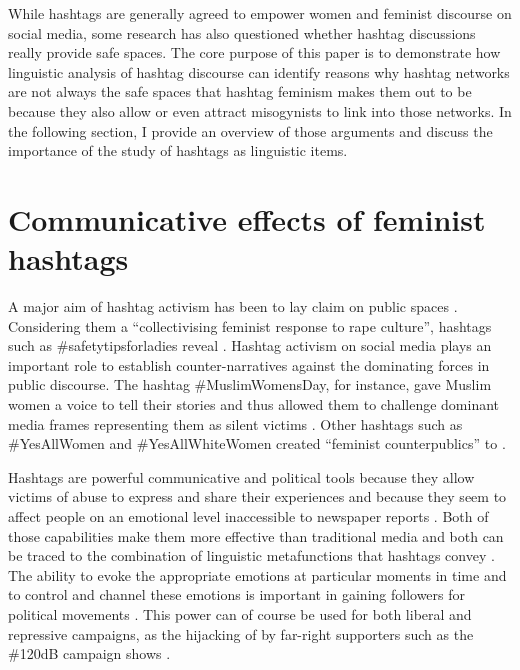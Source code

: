 \documentclass[output=paper,english,spanish,german,english]{langsci/langscibook}
\begin{document}
\noindent While hashtags are generally agreed to empower women and feminist discourse on social media, some research has also questioned whether hashtag discussions really provide safe spaces. The core purpose of this paper is to demonstrate how linguistic analysis of hashtag discourse can identify reasons why hashtag networks are not always the safe spaces that hashtag feminism makes them out to be because they also allow or even attract misogynists to link into those networks. In the following section, I provide an overview of those arguments and discuss the importance of the study of hashtags as linguistic items.

\section{Communicative effects of feminist hashtags}\label{comm}

A major aim of hashtag activism has been to lay claim on public spaces \parencites[63]{luemai13}{bowles15}. Considering them a \enquote{collectivising feminist response to rape culture}, hashtags such as \#safetytipsforladies reveal . Hashtag activism on social media plays an important role to establish counter-narratives against the dominating forces in public discourse. The hashtag \#MuslimWomensDay, for instance, gave Muslim women a voice to tell their stories and thus allowed them to challenge dominant media frames representing them as silent victims \parencite[200]{pennington18}. Other hashtags such as \#YesAllWomen and \#YesAllWhiteWomen created \enquote{feminist counterpublics} to .

Hashtags are powerful communicative and political tools because they allow victims of abuse to express and share their experiences and because they seem to affect people on an emotional level inaccessible to newspaper reports \parencites{keletal18}{menetal18}. Both of those capabilities make them more effective than traditional media and both can be traced to the combination of linguistic metafunctions that hashtags convey \parencite[see][]{zappavigna15}. The ability to evoke the appropriate emotions at particular moments in time and to control and channel these emotions is important in gaining followers for political movements \parencite{ahmed04}. This power can of course be used for both liberal and repressive campaigns, as the hijacking of \mt by far-right supporters such as the \#120dB campaign shows \parencites{farris17}{sorce18}{wielens19}.
\end{document}
